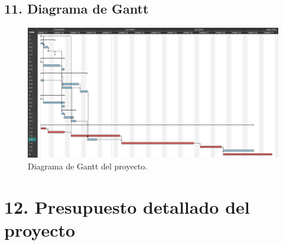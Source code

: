 \documentclass[
11pt, %
codirector, %
]{charter}
\begin{document}
\begin{landscape}
\section{11. Diagrama de Gantt}
\label{sec:gantt}
\begin{figure}[htpb]
\centering 
\includegraphics[height=.7\textheight]{./Figuras/Gantt_v1.png}
\caption{Diagrama de Gantt del proyecto.}
\label{fig:diagGantt}
\end{figure}
\end{landscape}


\section{12. Presupuesto detallado del proyecto}
\label{sec:presupuesto}



\end{document}
